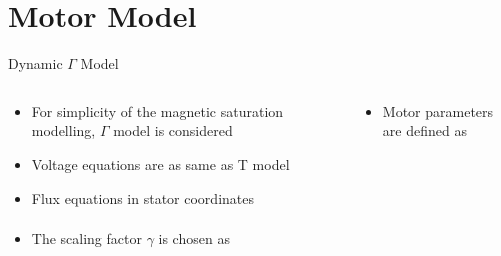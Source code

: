 \documentclass[11pt,aspectratio=169]{beamer}
\begin{document}
\section{Motor Model}
\begin{frame}{Dynamic $\Gamma$ Model}
\begin{columns}
	\begin{column}{.43\textwidth}
		\begin{itemize}
		\item For simplicity of the magnetic saturation modelling, $\Gamma$ model is considered 
			\item Voltage equations are as same as T model
			\item Flux equations in stator coordinates
				\begin{align*}
			\end{align*}
			\item The scaling factor $\gamma$ is chosen as
			\begin{align*}
			\end{align*}
		\end{itemize}
	\end{column}
\begin{column}{.53\textwidth}
	
	\begin{center}
		\small
		
	\end{center}
\begin{itemize}
	\item Motor parameters are defined as
	\end{itemize}
	\begin{align*}
\end{align*}
\end{column}
\end{columns}

\end{frame}



\end{document}
